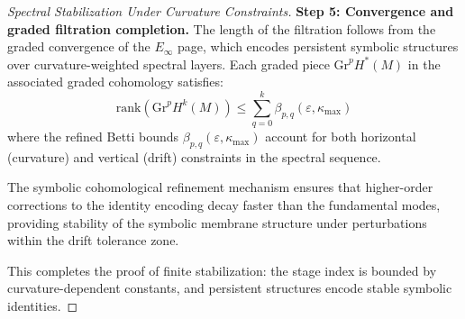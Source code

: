\begin{proof}[Spectral Stabilization Under Curvature Constraints]
\textbf{Step 5: Convergence and graded filtration completion.}
The length of the filtration follows from the graded convergence of the $E_\infty$ page, which encodes persistent symbolic structures over curvature-weighted spectral layers. Each graded piece $\text{Gr}^p H^*(M)$ in the associated graded cohomology satisfies:
\begin{equation}
\text{rank}(\text{Gr}^p H^k(M)) \leq \sum_{q=0}^k \beta_{p,q}(\varepsilon, \kappa_{\max})
\end{equation}
where the refined Betti bounds $\beta_{p,q}(\varepsilon, \kappa_{\max})$ account for both horizontal (curvature) and vertical (drift) constraints in the spectral sequence.

The symbolic cohomological refinement mechanism ensures that higher-order corrections to the identity encoding decay faster than the fundamental modes, providing stability of the symbolic membrane structure under perturbations within the drift tolerance zone.

This completes the proof of finite stabilization: the stage index is bounded by
curvature-dependent constants, and persistent structures encode stable symbolic
identities.
\end{proof}

